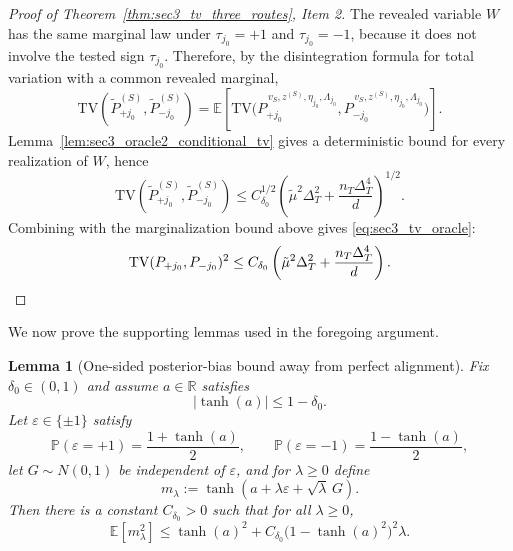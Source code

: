 \documentclass[10pt]{article}
\newtheorem{lemma}{Lemma}
\newcommand{\R}{\mathbb R}
\newcommand{\Pbb}{\mathbb P}
\newcommand{\Ebb}{\mathbb E}
\newcommand{\TV}{\mathrm{TV}}
\newcommand{\trg}{T}
\newcommand{\nT}{n_{\trg}}
\newcommand{\DeltaT}{\Delta_{\trg}}
\newcommand{\src}{S}
\newcommand{\zsrc}{z^{(\src)}}
\begin{document}
\begin{proof}[Proof of Theorem~\ref{thm:sec3_tv_three_routes}, Item 2]
The revealed variable $W$ has the same marginal law under $\tau_{j_0}=+1$ and
$\tau_{j_0}=-1$, because it does not involve the tested sign $\tau_{j_0}$. Therefore,
by the disintegration formula for total variation with a common revealed
marginal,
\[
    \TV(\widetilde P_{+j_0}^{(\src)},\widetilde P_{-j_0}^{(\src)})
    =
    \Ebb\!\left[
        \TV\!\bigl(
            P_{+j_0}^{\,v_{\src},\zsrc,\eta_{j_0},\Lambda_{j_0}},
            P_{-j_0}^{\,v_{\src},\zsrc,\eta_{j_0},\Lambda_{j_0}}
        \bigr)
    \right].
\]
Lemma~\ref{lem:sec3_oracle2_conditional_tv} gives a deterministic bound
for every realization of $W$, hence
\[
    \TV(\widetilde P_{+j_0}^{(\src)},\widetilde P_{-j_0}^{(\src)})
    \le
    C_{\delta_0}^{1/2}\left(
        \tilde\mu^2\DeltaT^2
        +
        \frac{\nT\DeltaT^4}{d}
    \right)^{1/2}.
\]
Combining with the marginalization bound above gives \eqref{eq:sec3_tv_oracle}:
\[
    \TV(P_{+j_0},P_{-j_0})^2
    \le
    C_{\delta_0}\left(
        \tilde\mu^2\DeltaT^2
        +
        \frac{\nT\DeltaT^4}{d}
    \right).\qedhere
\]
\end{proof}

We now prove the supporting lemmas used in the foregoing argument.

\begin{lemma}[One-sided posterior-bias bound away from perfect alignment]
\label{lem:sec3_posterior_bias_one_sided}
Fix $\delta_0\in(0,1)$ and assume $a\in\R$ satisfies
\[
    |\tanh(a)|\le 1-\delta_0.
\]
Let $\varepsilon\in\{\pm1\}$ satisfy
\[
    \Pbb(\varepsilon=+1)=\frac{1+\tanh(a)}{2},
    \qquad
    \Pbb(\varepsilon=-1)=\frac{1-\tanh(a)}{2},
\]
let $G\sim N(0,1)$ be independent of $\varepsilon$, and for $\lambda\ge 0$
define
\[
    m_\lambda:=\tanh(a+\lambda\varepsilon+\sqrt{\lambda}\,G).
\]
Then there is a constant $C_{\delta_0}>0$ such that for all $\lambda\ge 0$,
\[
    \Ebb[m_\lambda^2]
    \le
    \tanh(a)^2
    +
    C_{\delta_0}\bigl(1-\tanh(a)^2\bigr)^2\lambda.
\]
\end{lemma}
\end{document}

